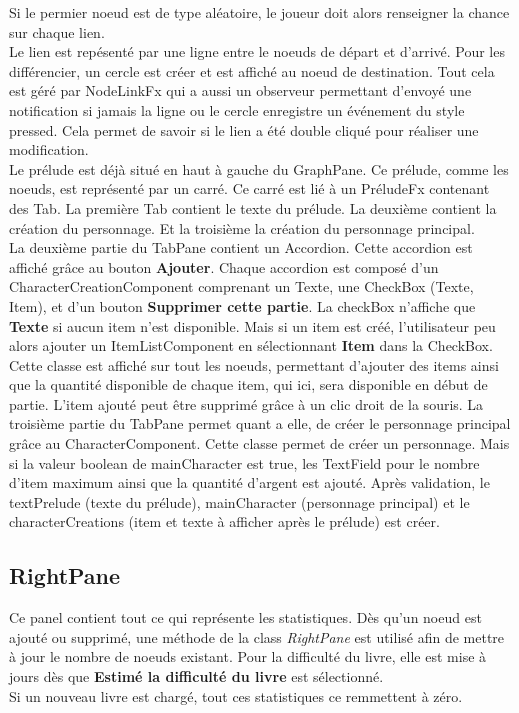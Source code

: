 		Si le permier noeud est de type aléatoire, le joueur doit alors renseigner la chance sur chaque lien.\\

		Le lien est repésenté par une ligne entre le noeuds de départ et d'arrivé. Pour les différencier, un cercle est créer et est affiché au noeud de destination. Tout cela est géré par NodeLinkFx qui a aussi un observeur permettant d'envoyé une notification si jamais la ligne ou le cercle enregistre un événement du style pressed. Cela permet de savoir si le lien a été double cliqué pour réaliser une modification.\\

		Le prélude est déjà situé en haut à gauche du GraphPane. Ce prélude, comme les noeuds, est représenté par un carré. Ce carré est lié à un PréludeFx contenant des Tab. La première Tab contient le texte du prélude. La deuxième contient la création du personnage. Et la troisième la création du personnage principal.\\
		La deuxième partie du TabPane contient un Accordion.  Cette accordion est affiché grâce au bouton \textbf{Ajouter}. Chaque accordion est composé d'un CharacterCreationComponent comprenant un Texte, une CheckBox (Texte, Item), et d'un bouton \textbf{Supprimer cette partie}. La checkBox n'affiche que \textbf{Texte} si aucun item n'est disponible. Mais si un item est créé, l'utilisateur peu alors ajouter un ItemListComponent en sélectionnant \textbf{Item} dans la CheckBox. Cette classe est affiché sur tout les noeuds, permettant d'ajouter des items ainsi que la quantité disponible de chaque item, qui ici, sera disponible en début de partie. L'item ajouté peut être supprimé grâce à un clic droit de la souris.
		La troisième partie du TabPane permet quant a elle, de créer le personnage principal grâce au CharacterComponent. Cette classe permet de créer un personnage. Mais si la valeur boolean de mainCharacter est true, les TextField pour le nombre d'item maximum ainsi que la quantité d'argent est ajouté.
		Après validation, le textPrelude (texte du prélude), mainCharacter (personnage principal) et le characterCreations (item et texte à afficher après le prélude) est créer.

		\subsection{RightPane}

		Ce panel contient tout ce qui représente les statistiques. Dès qu'un noeud est ajouté ou supprimé, une méthode de la class \textit{RightPane} est utilisé afin de mettre à jour le nombre de noeuds existant. Pour la difficulté du livre, elle est mise à jours dès que \textbf{Estimé la difficulté du livre} est sélectionné.\\
		Si un nouveau livre est chargé, tout ces statistiques ce remmettent à zéro.



